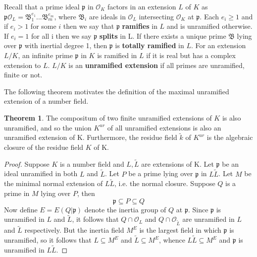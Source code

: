 \documentclass[12pt]{extarticle}
\newcommand{\<}{\langle}
\renewcommand{\>}{\rangle}
\theoremstyle{definition}
\newtheorem{theorem}{Theorem}
\begin{document}
Recall that a prime ideal $\mathfrak{p}$ in $\mathcal{O}_K$ factors in an extension $L$ of $K$ as
$\mathfrak{p}\mathcal{O}_L=\mathfrak{B}_1^{e_1}...\mathfrak{B}_m^{e_m}$, where $\mathfrak{B}_i$ are ideals in $\mathcal{O}_L$ intersecting $\mathcal{O}_K$ at $\mathfrak{p}$. Each $e_i\geq1$ and if $e_i>1$ for some $i$ then we say that $\mathfrak{p}$ \textbf{ramifies} in $L$ and is unramified otherwise. If $e_i=1$ for all i then we say $\mathfrak{p}$ \textbf{splits} in L. If there exists a unique prime $\mathfrak{B}$ lying over $\mathfrak{p}$ with inertial degree 1, then $\mathfrak{p}$ is \textbf{totally ramified} in $L$. For an extension $L/K$, an infinite prime $\mathfrak{p}$ in $K$ is ramified in $L$ if it is real but has a complex extension to $L$. $L/K$ is an \textbf{unramified extension} if all primes are unramified, finite or not. 
\par
The following theorem  motivates the definition of the maximal unramified extension of a number field. 
\begin{theorem}
The compositum of two finite unramified extensions of $K$ is also unramified, and so the union $K^{ur}$ of all unramified extensions is also an unramified extension of K. Furthermore, the residue field $\tilde{k}$ of $K^{ur}$ is the algebraic closure of the residue field $K$ of K.
\end{theorem}
\begin{proof}
    Suppose $K$ is a number field and $L,\tilde{L}$ are extensions of K. Let $\mathfrak{p}$ be an ideal unramified in both $L$ and $\tilde{L}$. Let $P$ be a prime lying over $\mathfrak{p}$ in $L\tilde{L}$. Let $M$ be the minimal normal extension of $L\tilde{L}$, i.e. the normal closure. Suppose $Q$ is a prime in $M$ lying over $P$, then  
    \begin{equation}
        \mathfrak{p}\subseteq P \subseteq Q
    \end{equation}
    Now define $E=E(Q|\mathfrak{p})$ denote the inertia group of $Q$ at $\mathfrak{p}$. 
    Since $\mathfrak{p}$ is unramified in $L$ and $\tilde{L}$, it follows that $Q \cap \mathcal{O}_L$ and $Q \cap \mathcal{O}_{\tilde{L}}$ are unramified in $L$ and $\tilde{L}$ respectively. 
 But the inertia field $M^E$ is the largest field in which $\mathfrak{p}$ is unramified, so it follows that $L\subseteq M^E$ and $\tilde{L} \subseteq M^E $, whence $L\tilde{L}\subseteq M^E$ and $\mathfrak{p}$ is unramified in $L\tilde{L}$.
\end{proof}
\end{document}

